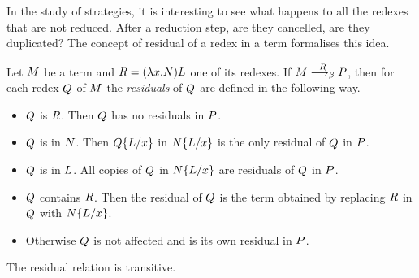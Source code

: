 \begin{THESIS}
	In the study of strategies, it is interesting to see what happens to all the redexes that are not reduced. After a reduction step, are they cancelled, are they duplicated? The concept of residual of a redex in a term formalises this idea.
	\begin{definition}
		Let $M$ be a term and $R=(\lambda x.N)L$ one of its redexes. If $M\overset{R}{\longrightarrow_\beta}P$, then for each redex $Q$ of $M$ the \emph{residuals} of $Q$ are defined in the following way.
		\begin{itemize}
			\item $Q$ is $R$. Then $Q$ has no residuals in $P$.
			\item $Q$ is in $N$. Then $Q\{L/x\}$ in $N\{L/x\}$ is the only residual of $Q$ in $P$.
			\item $Q$ is in $L$. All copies of $Q$ in $N\{L/x\}$ are residuals of $Q$ in $P$.
			\item $Q$ contains $R$. Then the residual of $Q$ is the term obtained by replacing $R$ in $Q$ with $N\{L/x\}$.
			\item Otherwise $Q$ is not affected and is its own residual in $P$.
		\end{itemize}
		The residual relation is transitive.
	\end{definition}

\end{THESIS}
